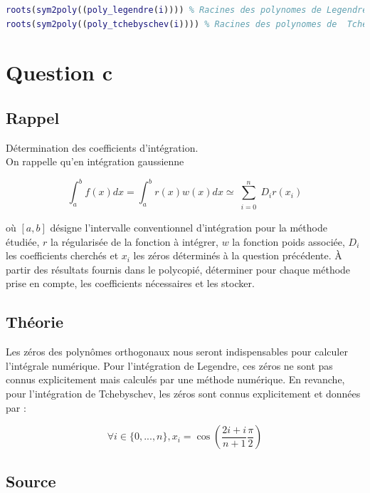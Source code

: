 \documentclass[a4paper,10pt]{report}
\begin{document}
\begin{lstlisting}[language=Matlab]
roots(sym2poly((poly_legendre(i)))) % Racines des polynomes de Legendre
roots(sym2poly((poly_tchebyschev(i)))) % Racines des polynomes de  Tchebyschev
\end{lstlisting}

\section*{Question c}

\subsection*{Rappel}

Détermination des coefficients d’intégration.\\
On rappelle qu'en intégration gaussienne

\begin{equation*}
\int_{a}^{b}f(x)dx = \int_{a}^{b}r(x) w(x)dx \simeq \sum_{\substack{i=0}}^{n}D_i r(x_i)
\end{equation*}

où $[a, b]$ désigne l’intervalle conventionnel d’intégration pour la méthode étudiée, $r$ la régularisée de la fonction à intégrer, $w$ la fonction poids associée, $D_i$ les coefficients cherchés et $x_i$ les zéros déterminés à la question précédente.
À partir des résultats fournis dans le polycopié, déterminer pour chaque méthode prise en compte, les coefficients nécessaires et les stocker.

\subsection*{Théorie}

Les zéros des polynômes orthogonaux nous seront indispensables pour calculer l’intégrale numérique. Pour l’intégration de Legendre, ces zéros ne sont pas connus explicitement mais calculés par une méthode numérique. En revanche, pour l’intégration de Tchebyschev, les zéros sont connus explicitement et données par :
    
\begin{equation*}
\forall{i} \in \{0, ..., n\}, x_i = \cos \left(\frac{2i + i}{n + 1}\frac{\pi}{2}\right)
\end{equation*}

\subsection*{Source}
\end{document}
